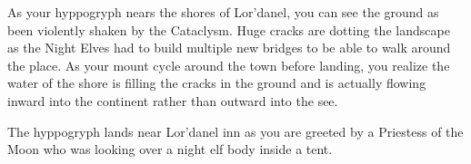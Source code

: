 As your hyppogryph nears the shores of Lor'danel, you can see the ground as been violently shaken by the Cataclysm. Huge cracks are dotting the landscape as the Night Elves had to build multiple new bridges to be able to walk around the place. As your mount cycle around the town before landing, you realize the water of the shore is filling the cracks in the ground and is actually flowing inward into the continent rather than outward into the see.

The hyppogryph lands near Lor'danel inn as you are greeted by a Priestess of the Moon who was looking over a night elf body inside a tent.


